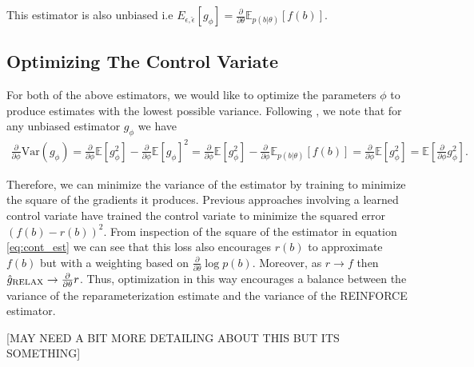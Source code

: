 \documentclass{article}
\newcommand{\E}{\mathbb{E}}
\newcommand{\PT}{\frac{\partial}{\partial \theta}}
\newcommand{\PPH}{\frac{\partial}{\partial \phi}}
\newcommand{\LP}[1]{\PT \log p(#1)}
\begin{document}


This estimator is also unbiased i.e $E_{\epsilon, \hat{\epsilon}}[g_\phi] = \PT\E_{p(b|\theta)}[f(b)]$.

\subsection{Optimizing The Control Variate}
For both of the above estimators, we would like to optimize the parameters $\phi$ to produce estimates with the lowest possible variance. Following \cite{tucker2017rebar}, we note that for any unbiased estimator $g_\phi$ we have 
\begin{align}
\PPH \text{Var}(g_\phi) = \PPH \E[g_\phi^2] - \PPH \E[g_\phi]^2
= \PPH \E[g_\phi^2] - \PPH \E_{p(b|\theta)}[f(b)]
= \PPH \E[g_\phi^2] = \E \left[ \PPH g_\phi^2 \right].
\end{align}

Therefore, we can minimize the variance of the estimator by training to minimize the square of the gradients it produces. Previous approaches involving a learned control variate have trained the control variate to minimize the squared error $(f(b) - r(b))^2$. From inspection of the square of the estimator in equation \ref{eq:cont_est} we can see that this loss also encourages $r(b)$ to approximate $f(b)$ but with a weighting based on $\PT\log p(b)$. Moreover, as $r \rightarrow f$ then $\hat g_\textnormal{RELAX} \rightarrow \PT r$. Thus, optimization in this way encourages a balance between the variance of the reparameterization estimate and the variance of the REINFORCE estimator. 

[MAY NEED A BIT MORE DETAILING ABOUT THIS BUT ITS SOMETHING]
\end{document}
